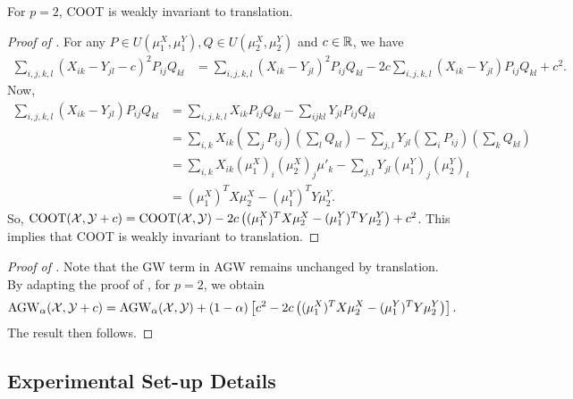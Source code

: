 \begin{lemma}
\label{prop:coot_invariant}
    For $p=2$, COOT is weakly invariant to translation.
\end{lemma}
\begin{proof}[Proof of ]
For any $P \in U(\mu_1^X, \mu_1^Y), Q \in U(\mu_2^X, \mu_2^Y)$ and $c \in \mathbb R$, we have
\begin{align}
    \sum_{i,j,k,l} (X_{ik} - Y_{jl} - c)^2 P_{ij} Q_{kl}
    &= \sum_{i,j,k,l} (X_{ik} - Y_{jl})^2 P_{ij} Q_{kl}
    - 2c \sum_{i,j,k,l} (X_{ik} - Y_{jl}) P_{ij} Q_{kl} + c^2.
\end{align}
Now,
\begin{align}
    \sum_{i,j,k,l} (X_{ik} - Y_{jl}) P_{ij} Q_{kl}
    &= \sum_{i,j,k,l} X_{ik} P_{ij} Q_{kl} - \sum_{ijkl} Y_{jl} P_{ij} Q_{kl} \\
    &= \sum_{i,k} X_{ik} \left( \sum_j P_{ij} \right) \left( \sum_l Q_{kl} \right)
    - \sum_{j,l} Y_{jl} \left( \sum_i P_{ij} \right) \left( \sum_k Q_{kl} \right) \\
    &= \sum_{i,k} X_{ik} (\mu_1^X)_i (\mu_2^X)_j \mu'_k - \sum_{j,l} Y_{jl} (\mu_1^Y)_j (\mu_2^Y)_l \\
    &= (\mu_1^X)^T X \mu_2^X - (\mu_1^Y)^T Y \mu_2^Y.
\end{align}
So, $\text{COOT}(\mathcal X, \mathcal Y + c) = \text{COOT}(\mathcal X, \mathcal Y) -
2 c \left( (\mu_1^X)^T X \mu_2^X - (\mu_1^Y)^T Y \mu_2^Y \right) + c^2$.
This implies that COOT is weakly invariant to translation.
\end{proof}

\begin{proof}[Proof of ]
Note that the GW term in AGW remains unchanged by translation.
By adapting the proof of , for $p=2$, we obtain
\begin{align}
    \text{AGW}_{\alpha}(\mathcal X, \mathcal Y + c) = \text{AGW}_{\alpha}(\mathcal X, \mathcal Y) + (1 - \alpha) \left[ c^2
    - 2 c \left( (\mu_1^X)^T X \mu_2^X - (\mu_1^Y)^T Y \mu_2^Y \right) \right].
\end{align}
The result then follows.
\end{proof}

\subsection{Experimental Set-up Details} \label{subsec:appendix_expe_agw}

